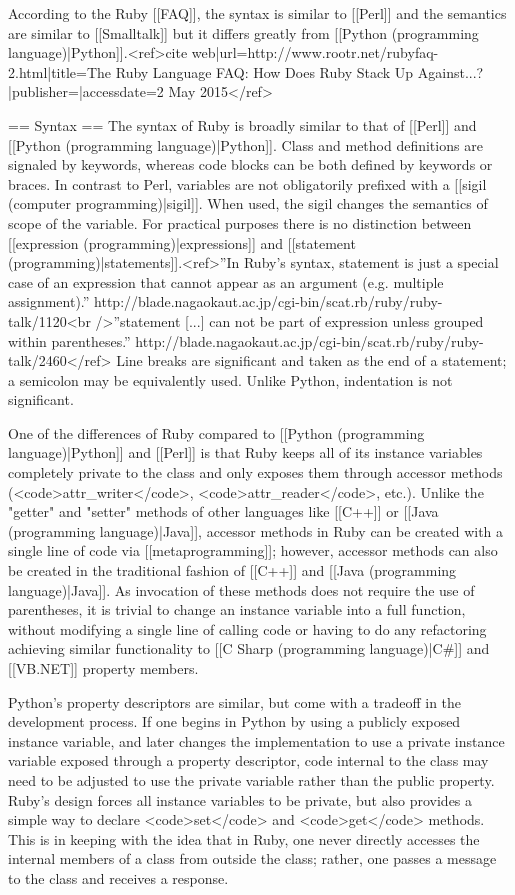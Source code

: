 According to the Ruby [[FAQ]],  the syntax is similar to [[Perl]] and the semantics are similar to [[Smalltalk]] but it differs greatly from [[Python (programming language)|Python]].<ref>{{cite web|url=http://www.rootr.net/rubyfaq-2.html|title=The Ruby Language FAQ: How Does Ruby Stack Up Against...?|publisher=|accessdate=2 May 2015}}</ref>

== Syntax ==
The syntax of Ruby is broadly similar to that of [[Perl]] and [[Python (programming language)|Python]]. Class and method definitions are signaled by keywords, whereas code blocks can be both defined by keywords or braces. In contrast to Perl, variables are not obligatorily prefixed with a [[sigil (computer programming)|sigil]]. When used, the sigil changes the semantics of scope of the variable. For practical purposes there is no distinction between [[expression (programming)|expressions]] and [[statement (programming)|statements]].<ref>''In Ruby's syntax, statement is just a special case of an expression that cannot appear as an argument (e.g. multiple assignment).'' http://blade.nagaokaut.ac.jp/cgi-bin/scat.rb/ruby/ruby-talk/1120<br />''statement [...] can not be part of expression unless grouped within parentheses.'' http://blade.nagaokaut.ac.jp/cgi-bin/scat.rb/ruby/ruby-talk/2460</ref> Line breaks are significant and taken as the end of a statement; a semicolon may be equivalently used. Unlike Python, indentation is not significant.

One of the differences of Ruby compared to [[Python (programming language)|Python]] and [[Perl]] is that Ruby keeps all of its instance variables completely private to the class and only exposes them through accessor methods (<code>attr_writer</code>, <code>attr_reader</code>, etc.). Unlike the "getter" and "setter" methods of other languages like [[C++]] or [[Java (programming language)|Java]], accessor methods in Ruby can be created with a single line of code via [[metaprogramming]]; however, accessor methods can also be created in the traditional fashion of [[C++]] and [[Java (programming language)|Java]]. As invocation of these methods does not require the use of parentheses, it is trivial to change an instance variable into a full function, without modifying a single line of calling code or having to do any refactoring achieving similar functionality to [[C Sharp (programming language)|C#]] and [[VB.NET]] property members.

Python's property descriptors are similar, but come with a tradeoff in the development process. If one begins in Python by using a publicly exposed instance variable, and later changes the implementation to use a private instance variable exposed through a property descriptor, code internal to the class may need to be adjusted to use the private variable rather than the public property. Ruby’s design forces all instance variables to be private, but also provides a simple way to declare <code>set</code> and <code>get</code> methods. This is in keeping with the idea that in Ruby, one never directly accesses the internal members of a class from outside the class; rather, one passes a message to the class and receives a response.

